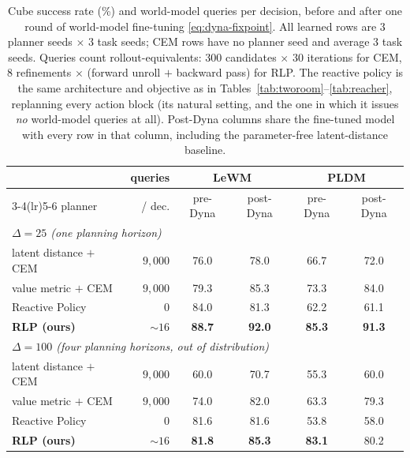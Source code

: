 \begin{table}[t]
\centering
\caption{Cube success rate (\%) and world-model queries per decision, before and
after one round of world-model fine-tuning \eqref{eq:dyna-fixpoint}. All learned
rows are $3$ planner seeds $\times$ $3$ task seeds; CEM rows have no planner
seed and average $3$ task seeds. Queries count rollout-equivalents: $300$
candidates $\times$ $30$ iterations for CEM, $8$ refinements $\times$ (forward
unroll $+$ backward pass) for RLP. The reactive policy is the same architecture
and objective as in Tables~\ref{tab:tworoom}--\ref{tab:reacher}, replanning every
action block (its natural setting, and the one in which it issues \emph{no}
world-model queries at all). Post-Dyna columns share the fine-tuned model with
every row in that column, including the parameter-free latent-distance
baseline.}
\label{tab:cube}
\begin{tabular}{lrcccc}
\toprule
& queries & \multicolumn{2}{c}{LeWM} & \multicolumn{2}{c}{PLDM} \\
\cmidrule(lr){3-4}\cmidrule(lr){5-6}
planner & / dec. & pre-Dyna & post-Dyna & pre-Dyna & post-Dyna \\
\midrule
\multicolumn{6}{l}{\emph{$\Delta = 25$ (one planning horizon)}} \\
\quad latent distance $+$ CEM & $9{,}000$ & 76.0 & 78.0 & 66.7 & 72.0 \\
\quad value metric $+$ CEM    & $9{,}000$ & 79.3 & 85.3 & 73.3 & 84.0 \\
\quad Reactive Policy         & $0$       & 84.0 & 81.3 & 62.2 & 61.1 \\
\quad \textbf{RLP (ours)}     & ${\sim}16$ & \textbf{88.7} & \textbf{92.0} & \textbf{85.3} & \textbf{91.3} \\
\midrule
\multicolumn{6}{l}{\emph{$\Delta = 100$ (four planning horizons, out of distribution)}} \\
\quad latent distance $+$ CEM & $9{,}000$ & 60.0 & 70.7 & 55.3 & 60.0 \\
\quad value metric $+$ CEM    & $9{,}000$ & 74.0 & 82.0 & 63.3 & 79.3 \\
\quad Reactive Policy         & $0$       & 81.6 & 81.6 & 53.8 & 58.0 \\
\quad \textbf{RLP (ours)}     & ${\sim}16$ & \textbf{81.8} & \textbf{85.3} & \textbf{83.1} & 80.2 \\
\bottomrule
\end{tabular}
\end{table}

